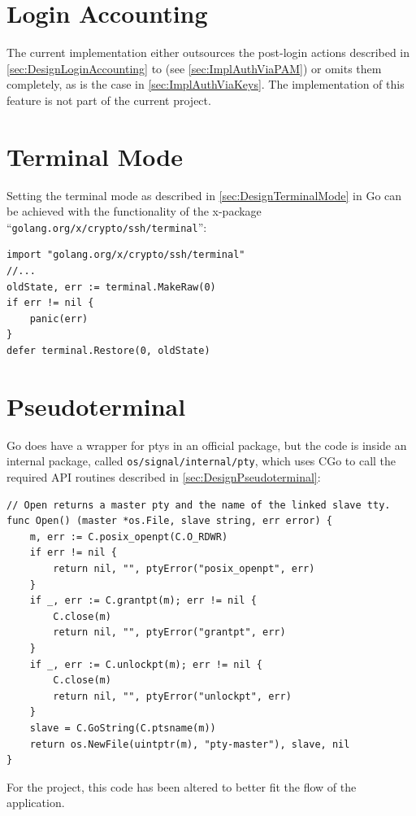 \documentclass[10pt,a4paper,titlepage,twoside,english,final]{zhawreprt}
\begin{document}
\section{Login Accounting}\label{sec:ImplLoginAccounting}
The current implementation either outsources the post-\gls{login} actions described in \ref{sec:DesignLoginAccounting} to \cite{login}(see \ref{sec:ImplAuthViaPAM}) or omits them completely, as is the case in \ref{sec:ImplAuthViaKeys}.
The implementation of this feature is not part of the current project.

\section{Terminal Mode}\label{sec:ImplTerminalMode}
Setting the \gls{terminal} mode as described in \ref{sec:DesignTerminalMode} in \gls{Go} can be achieved with the functionality of the x-package ``\texttt{golang.org/x/crypto/ssh/terminal}'':
\setlistingGo
\begin{lstlisting}[caption={Setting the \gls{terminal} mode in \gls{Go}},label=lst:GoTermMode]
import "golang.org/x/crypto/ssh/terminal"
//...
oldState, err := terminal.MakeRaw(0)
if err != nil {
	panic(err)
}
defer terminal.Restore(0, oldState)
\end{lstlisting}

\section{Pseudoterminal}\label{sec:ImplPseudoterminal}
\gls{Go} does have a wrapper for \glspl{pty} in an official package, but the code is inside an internal package, called \texttt{os/signal/internal/pty}, which uses \gls{CGo} to call the required \gls{API} routines described in \ref{sec:DesignPseudoterminal}:
\setlistingGo
\begin{lstlisting}[caption={\gls{Go}'s \gls{pty} wrapper},label=lst:GoPty]
// Open returns a master pty and the name of the linked slave tty.
func Open() (master *os.File, slave string, err error) {
	m, err := C.posix_openpt(C.O_RDWR)
	if err != nil {
		return nil, "", ptyError("posix_openpt", err)
	}
	if _, err := C.grantpt(m); err != nil {
		C.close(m)
		return nil, "", ptyError("grantpt", err)
	}
	if _, err := C.unlockpt(m); err != nil {
		C.close(m)
		return nil, "", ptyError("unlockpt", err)
	}
	slave = C.GoString(C.ptsname(m))
	return os.NewFile(uintptr(m), "pty-master"), slave, nil
}
\end{lstlisting}
For the project, this code has been altered to better fit the flow of the application.
\end{document}
